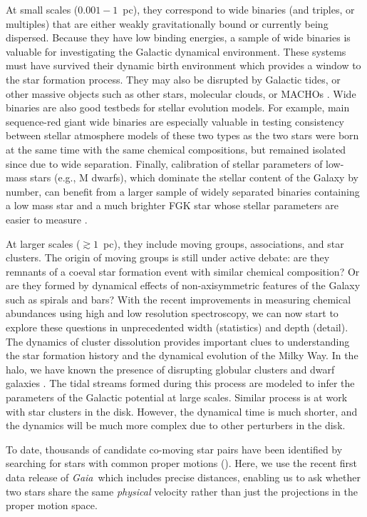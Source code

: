 \documentclass[manuscript, letterpaper]{aastex6}
\newcommand{\project}[1]{\textsl{#1}}
\newcommand{\gaia}{\project{Gaia}}
\begin{document}
At small scales ($0.001-1$~pc), they correspond to wide binaries (and triples, or
multiples) that are
either weakly gravitationally bound or currently being dispersed.
Because they have low binding energies,
a sample of wide binaries is valuable for investigating
the Galactic dynamical environment.
These systems must have survived their dynamic birth environment which
provides a window to the star formation process.
They may also be disrupted by Galactic tides, or other massive objects
such as other stars, molecular clouds, or MACHOs \citep{Yoo:2004aa,Allen:2014aa}.
Wide binaries are also good testbeds for stellar evolution models.
For example, main sequence-red giant wide binaries are especially valuable
in testing consistency between stellar atmosphere models of these two types
as the two stars were born at the same time with the same chemical compositions,
but remained isolated since due to wide separation.
Finally, calibration of stellar parameters of low-mass stars (e.g., M dwarfs),
which dominate the stellar content of the Galaxy by number, can benefit from
a larger sample of widely separated binaries containing a low mass star and a
much brighter FGK star whose stellar parameters are easier to measure
\citep[e.g.,][]{Rojas-Ayala:2012aa}.

At larger scales ($\gtrsim 1$~pc), they include moving groups, associations, and star clusters.
The origin of moving groups is still under active debate: are they remnants of a coeval
star formation event with similar chemical composition? Or are they formed by
dynamical effects of non-axisymmetric features of the Galaxy such as spirals
and bars? With the recent improvements in measuring chemical abundances
using high and low resolution spectroscopy, we can now start to explore these questions
in unprecedented width (statistics) and depth (detail).
The dynamics of cluster dissolution provides important clues to understanding
the star formation history and the dynamical evolution of the Milky Way.
In the halo, we have known the presence of disrupting globular clusters and dwarf galaxies
\citep[e.g.,][]{Ibata:1994aa}.
The tidal streams formed during this process are modeled to infer the
parameters of the Galactic potential at large scales.
Similar process is at work with star clusters in the disk. However, the dynamical
time is much shorter, and the dynamics will be much more complex due to other
perturbers in the disk.

To date, thousands of candidate co-moving star pairs have been identified by
searching for stars with common proper motions
(\citealt{Poveda:1994aa,Allen:2000aa,Chaname:2004aa,Lepine:2007aa,Alonso-Floriano:2015aa}).
Here, we use the recent first data release of \gaia\ which includes precise distances,
enabling us to ask whether two stars share the same {\it physical} velocity rather than
just the projections in the proper motion space.
\end{document}

